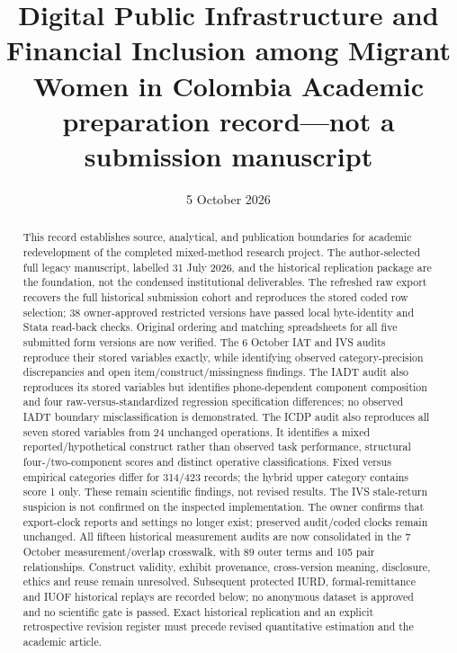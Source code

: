 \documentclass[11pt,a4paper]{article}
\title{Digital Public Infrastructure and Financial Inclusion\newline
among Migrant Women in Colombia\newline
\large Academic preparation record---not a submission manuscript}
\author{}
\date{5 October 2026}
\begin{document}
\maketitle

\begin{abstract}
This record establishes source, analytical, and publication boundaries for academic redevelopment of the completed mixed-method research project. The author-selected full legacy manuscript, labelled 31 July 2026, and the historical replication package are the foundation, not the condensed institutional deliverables. The refreshed raw export recovers the full historical submission cohort and reproduces the stored coded row selection; 38 owner-approved restricted versions have passed local byte-identity and Stata read-back checks. Original ordering and matching spreadsheets for all five submitted form versions are now verified. The 6 October IAT and IVS audits reproduce their stored variables exactly, while identifying observed category-precision discrepancies and open item/construct/missingness findings. The IADT audit also reproduces its stored variables but identifies phone-dependent component composition and four raw-versus-standardized regression specification differences; no observed IADT boundary misclassification is demonstrated. The ICDP audit also reproduces all seven stored variables from 24 unchanged operations. It identifies a mixed reported/hypothetical construct rather than observed task performance, structural four-/two-component scores and distinct operative classifications. Fixed versus empirical categories differ for 314/423 records; the hybrid upper category contains score 1 only. These remain scientific findings, not revised results. The IVS stale-return suspicion is not confirmed on the inspected implementation. The owner confirms that export-clock reports and settings no longer exist; preserved audit/coded clocks remain unchanged. All fifteen historical measurement audits are now consolidated in the 7 October measurement/overlap crosswalk, with 89 outer terms and 105 pair relationships. Construct validity, exhibit provenance, cross-version meaning, disclosure, ethics and reuse remain unresolved. Subsequent protected IURD, formal-remittance and IUOF historical replays are recorded below; no anonymous dataset is approved and no scientific gate is passed. Exact historical replication and an explicit retrospective revision register must precede revised quantitative estimation and the academic article.
\end{abstract}
\end{document}
